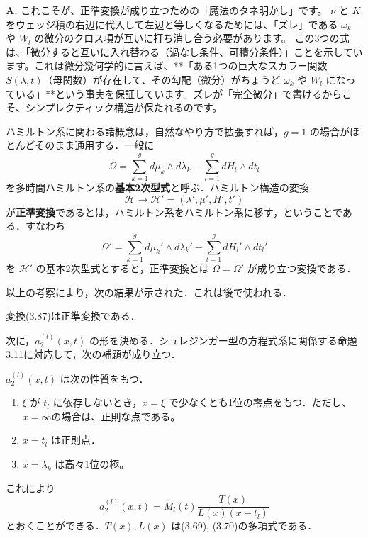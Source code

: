 \begin{Q}
\textbf{A.} これこそが、正準変換が成り立つための「魔法のタネ明かし」です。
$\nu$ と $K$ をウェッジ積の右辺に代入して左辺と等しくなるためには、「ズレ」である $\omega_k$ や $W_l$ の微分のクロス項が互いに打ち消し合う必要があります。
この3つの式は、「微分すると互いに入れ替わる（渦なし条件、可積分条件）」ことを示しています。これは微分幾何学的に言えば、**「ある1つの巨大なスカラー関数 $S(\lambda, t)$（母関数）が存在して、その勾配（微分）がちょうど $\omega_k$ や $W_l$ になっている」**という事実を保証しています。ズレが「完全微分」で書けるからこそ、シンプレクティック構造が保たれるのです。
\end{Q}

\begin{story}
ハミルトン系に関わる諸概念は，自然なやり方で拡張すれば，$g=1$ の場合がほとんどそのまま通用する．一般に
\begin{equation}
    \Omega = \sum_{k=1}^g d\mu_k \wedge d\lambda_k - \sum_{l=1}^g dH_l \wedge dt_l \label{eq:3.88}
\end{equation}
を多時間ハミルトン系の\textbf{基本2次型式}と呼ぶ．ハミルトン構造の変換
\begin{equation*}
    \mathcal{H} \to \mathcal{H}' = (\lambda', \mu', H', t')
\end{equation*}
が\textbf{正準変換}であるとは，ハミルトン系をハミルトン系に移す，ということである．すなわち
\begin{equation*}
    \Omega' = \sum_{k=1}^g d\mu_k' \wedge d\lambda_k' - \sum_{l=1}^g dH_l' \wedge dt_l'
\end{equation*}
を $\mathcal{H}'$ の基本2次型式とすると，正準変換とは $\Omega = \Omega'$ が成り立つ変換である．

以上の考察により，次の結果が示された．これは後で使われる．
\begin{lemma}[3.7]
変換(3.87)は正準変換である．
\end{lemma}

次に，$a_2^{(l)}(x,t)$ の形を決める．シュレジンガー型の方程式系に関係する命題3.11に対応して，次の補題が成り立つ．
\begin{lemma}[3.8]
$a_2^{(l)}(x,t)$ は次の性質をもつ．
\begin{enumerate}
    \item[(1)] $\xi$ が $t_l$ に依存しないとき，$x=\xi$ で少なくとも1位の零点をもつ．ただし、$x=\infty$の場合は、正則な点である。
    \item[(2)] $x=t_l$ は正則点．
    \item[(3)] $x=\lambda_k$ は高々1位の極。
\end{enumerate}
\end{lemma}

これにより
\begin{equation}
    a_2^{(l)}(x,t) = M_l(t) \frac{T(x)}{L(x)(x-t_l)} \label{eq:3.89}
\end{equation}
とおくことができる．$T(x), L(x)$ は(3.69), (3.70)の多項式である．
\end{story}
